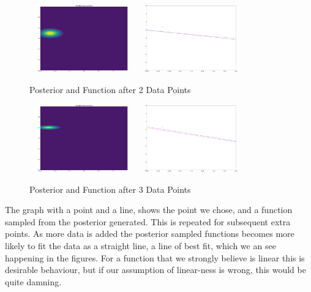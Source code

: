 \documentclass[a4paper, 9pt]{article}
\begin{document}
\begin{figure}[H]
\begin{center}
\includegraphics[width=1.8in,height=1.15in]{posterior2}
\includegraphics[width=1.8in,height=1.15in]{data2} \\
\end{center}
\caption{Posterior and Function after 2 Data Points}
\end{figure}
\begin{figure}[H]
\begin{center}
\includegraphics[width=1.8in,height=1.15in]{posterior3}
\includegraphics[width=1.8in,height=1.15in]{data3} \\
\end{center}
\caption{Posterior and Function after 3 Data Points}
\end{figure}

The graph with a point and a line, shows the point we chose, and a function sampled from the posterior generated. This is repeated for subsequent extra points.
As more data is added the posterior sampled functions becomes more likely to fit the data as a straight line, a line of best fit, which we an see happening in the figures. For a function that we strongly believe is linear this is desirable behaviour, but if our assumption of linear-ness is wrong, this would be quite damning.  
\end{document}
